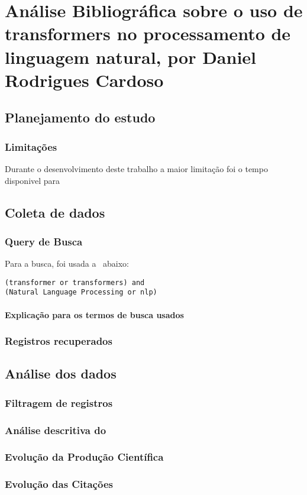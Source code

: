 \chapter{Análise Bibliográfica sobre o uso de transformers no processamento de linguagem natural, por Daniel Rodrigues Cardoso}

\section{Planejamento do estudo}

\subsection{Limitações}Durante o desenvolvimento deste trabalho a maior limitação foi o tempo disponivel para 

\section{Coleta de dados}

\subsection{Query de Busca}
Para a busca, foi usada a \query\ abaixo:
\begin{verbatim}
(transformer or transformers) and 
(Natural Language Processing or nlp)
\end{verbatim}
\subsubsection{Explicação para os termos de busca usados}

\subsection{Registros recuperados}

\section{Análise dos dados}

\subsection{Filtragem de registros}

\subsection{Análise descritiva do \dataset\   }

\subsection{Evolução da Produção Científica}

\subsection{Evolução das Citações}

